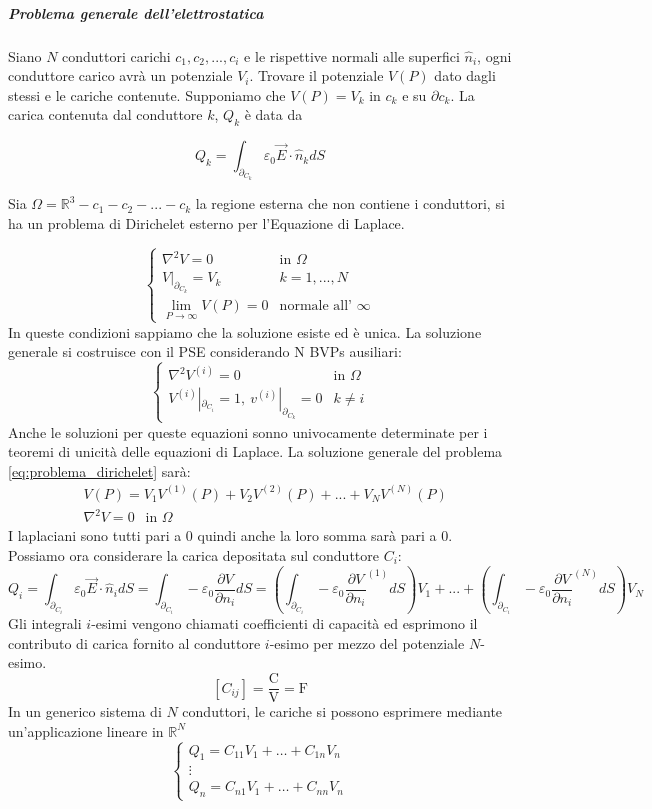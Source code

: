 \subparagraph{Problema generale dell'elettrostatica}

Siano $N$ conduttori carichi $c_1,c_2,...,c_i$ e le rispettive normali alle superfici
$\hat{n}_i$, ogni conduttore carico avrà un potenziale $V_i$. Trovare il potenziale $V(P)$ 
dato dagli stessi e le cariche contenute.
Supponiamo che $V(P) = V_k$ in $c_k$ e su $\partial c_k$.
La carica contenuta dal conduttore $k$, $Q_k$ è data da

$$
Q_k = \int_{\partial_{C_k}} \varepsilon_0 \vec{E}\cdot\hat{n}_k dS
$$

Sia $\Omega = \mathbb{R}^3 - c_1 - c_2 - ... - c_k$ la regione esterna che non contiene i
conduttori, si ha un problema di Dirichelet esterno per l'Equazione di Laplace.

\begin{equation}
\begin{cases}
\nabla^2 V = 0 & \text{in } \Omega\\
V|_{\partial_{C_k}} = V_k & k=1,...,N \\
\lim_{P\to \infty}V(P)=0 & \text{normale all' } \infty
\end{cases}
\label{eq:problema_dirichelet}
\end{equation}
In queste condizioni sappiamo che la soluzione esiste ed è unica.
La soluzione generale si costruisce con il PSE considerando N BVPs ausiliari:
$$
\begin{cases}
\nabla^2 V^{(i)} = 0 &\text{in } \Omega\\
V^{(i)}|_{\partial_{C_i}} = 1,\ v^{(i)}|_{\partial_{C_k}} = 0 &  k \neq i
\end{cases}
$$
Anche le soluzioni per queste equazioni sonno univocamente determinate per i teoremi di unicità
delle equazioni di Laplace.
La soluzione generale del problema \ref{eq:problema_dirichelet} sarà:
\begin{align*}
&V(P) = V_1V^{(1)}(P) + V_2V^{(2)}(P) + ... + V_NV^{(N)}(P) \\
& \nabla^2 V = 0 \ \ \text{ in }\Omega
\end{align*}
I laplaciani sono tutti pari a 0 quindi anche la loro somma sarà pari a 0.
Possiamo ora considerare la carica depositata sul conduttore $C_i$:
$$
Q_i = \int_{\partial_{C_i}} \varepsilon_0 \vec{E} \cdot \hat{n}_i dS = \int_{\partial_{C_i}} -\varepsilon_0 \frac{\partial V}{\partial n_i} dS = \left(\int_{\partial_{C_i}} - \varepsilon_0 \frac{\partial V}{\partial n_i}^{(1)} dS\right)V_1 + ... + \left(\int_{\partial_{C_i}} - \varepsilon_0 \frac{\partial V}{\partial n_i}^{(N)} dS\right)V_N
$$
Gli integrali $i$-esimi vengono chiamati coefficienti di capacità ed esprimono il contributo
di carica fornito al conduttore $i$-esimo per mezzo del potenziale $N$-esimo.
$$
[C_{ij}] = \frac{\si{\coulomb}}{\si{\volt}} = \si{\farad}
$$
In un generico sistema di $N$ conduttori, le cariche si possono esprimere mediante
un'applicazione lineare in $\mathbb{R}^N$
$$
\begin{cases}
Q_1 = C_{11}V_1 + \ldots + C_{1n}V_n \\
\vdots \\
Q_n = C_{n1}V_1 + \ldots + C_{nn}V_n
\end{cases}
$$

